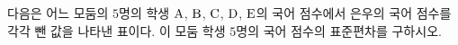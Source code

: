 다음은 어느 모둠의 $5$명의 학생 $\mathrm{A}$, $\mathrm{B}$, $\mathrm{C}$, $\mathrm{D}$, $\mathrm{E}$의 국어 점수에서 은우의 국어 점수를 각각 뺀 값을 나타낸 표이다. 이 모둠 학생 $5$명의 국어 점수의 표준편차를 구하시오.
\par\smallskip\begin{center}\resizebox{\ifdim\width>\linewidth\linewidth\else\width\fi}{!}{}\end{center}
